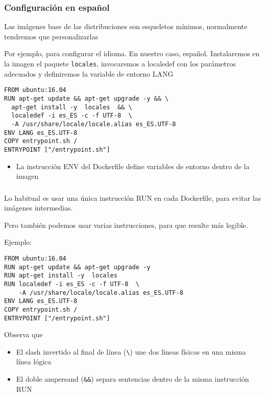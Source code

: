 \documentclass[ucs]{beamer}
\begin{document}
\begin{frame}[fragile]
\frametitle{Configuración en español}
Las imágenes base de las distribuciones son esqueletos mínimos,
normalmente tendremos que personalizarlas 


Por ejemplo, para configurar el idioma. En nuestro caso, español.
Instalaremos en la imagen el paquete 
\verb|locales|,
invocaremos a localedef con los parámetros adecuados y definiremos
la variable de entorno LANG

  \begin{scriptsize}
  \begin{verbatim}
FROM ubuntu:16.04
RUN apt-get update && apt-get upgrade -y && \
  apt-get install -y  locales  && \
  localedef -i es_ES -c -f UTF-8  \
  -A /usr/share/locale/locale.alias es_ES.UTF-8
ENV LANG es_ES.UTF-8
COPY entrypoint.sh /
ENTRYPOINT ["/entrypoint.sh"]
  \end{verbatim}
  \end{scriptsize}

\begin{itemize}
\item
La instrucción ENV del Dockerfile define variables de entorno dentro de la imagen
\end{itemize}

\end{frame}

\begin{frame}[fragile]
\frametitle{}
Lo habitual es usar una única instrucción RUN en cada Dockerfile,
para evitar las imágenes intermedias.

Pero también podemos usar varias instrucciones, para que resulte
más legible.

Ejemplo:
  \begin{scriptsize}
  \begin{verbatim}
FROM ubuntu:16.04
RUN apt-get update && apt-get upgrade -y 
RUN apt-get install -y  locales  
RUN localedef -i es_ES -c -f UTF-8  \
    -A /usr/share/locale/locale.alias es_ES.UTF-8
ENV LANG es_ES.UTF-8
COPY entrypoint.sh /
ENTRYPOINT ["/entrypoint.sh"]
  \end{verbatim}
  \end{scriptsize}


Observa que 
\begin{itemize}
\item
El slash invertido al final de línea (\verb|\|) une dos líneas físicas
en una misma línea lógica

\item
El doble ampersand (\verb|&&|) separa sentencias dentro de la misma
instrucción RUN

\end{itemize}

\end{frame}
\end{document}
